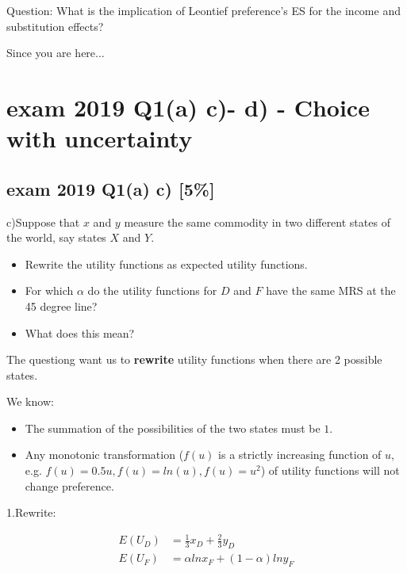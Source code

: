 \documentclass{article}
\begin{document}
\begin{mdframed}[backgroundcolor=blue!20,linecolor=white]
Question: What is the implication of Leontief preference's ES for the income and substitution effects? 
\end{mdframed}

\newpage

Since you are here...
\section{exam 2019 Q1(a) c)- d) - Choice with uncertainty}

\subsection{exam 2019 Q1(a) c) [5\%] }

c)Suppose that $x$ and $y$ measure the same commodity in two
different states of the world, say states $X$ and $Y$. 

\begin{itemize}
\item Rewrite the utility functions as expected utility functions. 
\item For which $\alpha$ do the utility functions for $D$ and $F$ have the same MRS at the 45 degree line?
\item What does this mean?
\end{itemize}

\begin{mdframed}[backgroundcolor=blue!20,linecolor=white]

The questiong want us to \textbf{rewrite} utility functions when there are 2 possible states. 

We know:
\begin{itemize}
\item The summation of the possibilities of the two states must be $1$.
\item Any monotonic transformation ($f(u)$ is a strictly increasing function of $u$, e.g. $f(u) = 0.5 u, f(u) = ln(u), f(u)=u^2 $) of utility functions will not change preference.
\end{itemize}
\end{mdframed}

1.Rewrite:

\begin{align*}
E(U_D) &= \frac{1}{3}x_D + \frac{2}{3}y_D \\
E(U_F) &= \alpha ln x_F +  ({1-\alpha}) ln y_F 
\end{align*}
\end{document}

